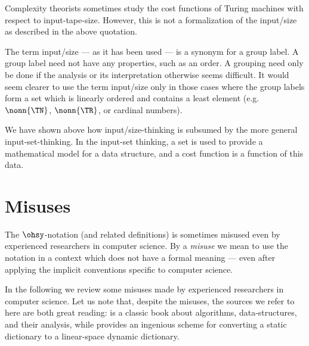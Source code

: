 \documentclass[b5paper, english, oneside]{memoir}
\begin{document}
Complexity theorists sometimes study the cost functions of Turing machines with respect to input-tape-size. However, this is not a formalization of the input\-/size as described in the above quotation. 

The term input\-/size --- as it has been used --- is a synonym for a group label. A group label need not have any properties, such as an order. A grouping need only be done if the analysis or its interpretation otherwise seems difficult. It would seem clearer to use the term input\-/size only in those cases where the group labels form a set which is linearly ordered and contains a least element (e.g. $\nonn{\TN}$, $\nonn{\TR}$, or cardinal numbers).

We have shown above how input\-/size-thinking is subsumed by the more general input-set-thinking. In the input-set thinking, a set is used to provide a mathematical model for a data structure, and a cost function is a function of this data. 

\section{Misuses}
\label{Misuses}

The $\ohsy$-notation (and related definitions) is sometimes misused even by experienced researchers in computer science. By a \emph{misuse} we mean to use the notation in a context which does not have a formal meaning --- even after applying the implicit conventions specific to computer science. 

In the following we review some misuses made by experienced researchers in computer science. Let us note that, despite the misuses, the sources we refer to here are both great reading: \cite{IntroAlgo2009} is a classic book about algorithms, data-structures, and their analysis, while \cite{ExponentialTrees} provides an ingenious scheme for converting a static dictionary to a linear-space dynamic dictionary.
\end{document}
